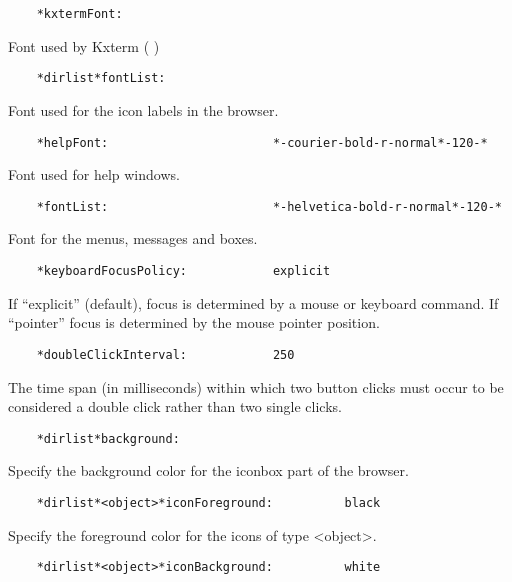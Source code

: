 \begin{verbatim}
    *kxtermFont:
\end{verbatim}

   Font used by Kxterm (\PAWPP{} \EW)

\begin{verbatim}
    *dirlist*fontList:
\end{verbatim}

   Font used for the icon labels in the browser.

\begin{verbatim}
    *helpFont:                       *-courier-bold-r-normal*-120-*
\end{verbatim}

   Font used for help windows.

\begin{verbatim}
    *fontList:                       *-helvetica-bold-r-normal*-120-*
\end{verbatim}

   Font for the menus, messages and boxes.

\begin{verbatim}
    *keyboardFocusPolicy:            explicit
\end{verbatim}

   If ``explicit'' (default), focus is determined by a mouse or keyboard
   command. If ``pointer'' focus is determined by the mouse pointer position.

\begin{verbatim}
    *doubleClickInterval:            250
\end{verbatim}

   The time span (in milliseconds) within which two button clicks must occur
   to be considered a double click rather than two single clicks.

\begin{verbatim}
    *dirlist*background:
\end{verbatim}

   Specify the background color for the iconbox part of the browser.

\begin{verbatim}
    *dirlist*<object>*iconForeground:          black
\end{verbatim}

   Specify the foreground color for the icons of type <object>.

\begin{verbatim}
    *dirlist*<object>*iconBackground:          white
\end{verbatim}


